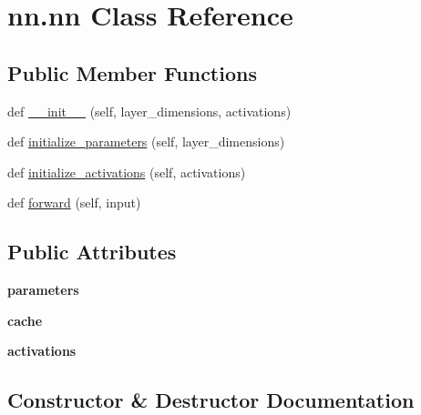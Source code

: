 \hypertarget{classnn_1_1nn}{}\section{nn.\+nn Class Reference}
\label{classnn_1_1nn}
\subsection*{Public Member Functions}
\begin{DoxyCompactItemize}
\item 
def \hyperlink{classnn_1_1nn_ad7304c7932970a07bf2869e97b79e0b5}{\+\_\+\+\_\+init\+\_\+\+\_\+} (self, layer\+\_\+dimensions, activations)
\item 
def \hyperlink{classnn_1_1nn_a9821fed1369b4d709fe297fe9e07d97b}{initialize\+\_\+parameters} (self, layer\+\_\+dimensions)
\item 
def \hyperlink{classnn_1_1nn_a1f6dba2cb835e0d723f39106534062a7}{initialize\+\_\+activations} (self, activations)
\item 
def \hyperlink{classnn_1_1nn_ace3e99e16bb7d1256d4d1fbf7e6cebd0}{forward} (self, input)
\end{DoxyCompactItemize}
\subsection*{Public Attributes}
\begin{DoxyCompactItemize}
\item 
\mbox{\label{classnn_1_1nn_a69da89bd6d17dbc8596ab586b7678237}} 
{\bfseries parameters}
\item 
\mbox{\label{classnn_1_1nn_a1f75a6242fc9ee82ca2632e18979b4d3}} 
{\bfseries cache}
\item 
\mbox{\label{classnn_1_1nn_acb7fb4cc0db120b007ef1ab1f82d7ba0}} 
{\bfseries activations}
\end{DoxyCompactItemize}


\subsection{Constructor \& Destructor Documentation}
\mbox{\label{classnn_1_1nn_ad7304c7932970a07bf2869e97b79e0b5}} 
